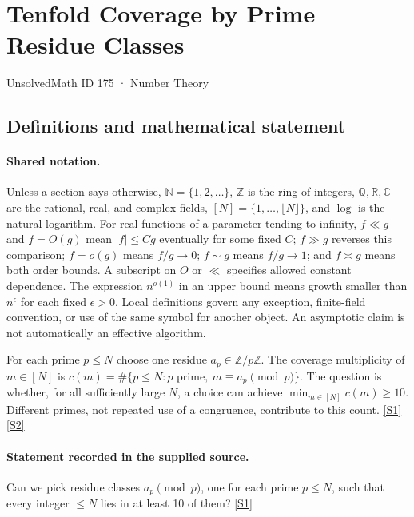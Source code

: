\documentclass[11pt,a4paper]{article}
\newcommand{\N}{\mathbb{N}}
\newcommand{\Z}{\mathbb{Z}}
\newcommand{\Q}{\mathbb{Q}}
\newcommand{\R}{\mathbb{R}}
\newcommand{\C}{\mathbb{C}}
\newcommand{\sref}[2]{\hyperlink{source:#1:#2}{[S#2]}}
\begin{document}

\setcounter{section}{174}

\section{Tenfold Coverage by Prime Residue Classes}\label{175}

{\small\sffamily UnsolvedMath ID 175 · Number Theory}

\subsection{Definitions and mathematical statement}

\paragraph{Shared notation.}Unless a section says otherwise, $\N=\{1,2,\ldots\}$,
$\Z$ is the ring of integers, $\Q,\R,\C$ are the rational, real, and complex
fields, $[N]=\{1,\ldots,\lfloor N\rfloor\}$, and $\log$ is the natural
logarithm. For real functions of a parameter tending to infinity,
$f\ll g$ and $f=O(g)$ mean $|f|\leq Cg$ eventually for some fixed $C$;
$f\gg g$ reverses this comparison; $f=o(g)$ means $f/g\to0$;
$f\sim g$ means $f/g\to1$; and $f\asymp g$ means both order bounds.
A subscript on $O$ or $\ll$ specifies allowed constant dependence.
The expression $n^{o(1)}$ in an upper bound means growth smaller than
$n^\epsilon$ for each fixed $\epsilon>0$. Local definitions govern any
exception, finite-field convention, or use of the same symbol for another
object. An asymptotic claim is not automatically an effective algorithm.



For each prime $p\leq N$ choose one residue $a_p\in\Z/p\Z$. The coverage multiplicity of $m\in[N]$ is $c(m)=\#\{p\leq N:p\text{ prime},\ m\equiv a_p\pmod p\}$. The question is whether, for all sufficiently large $N$, a choice can achieve $\min_{m\in[N]}c(m)\geq10$. Different primes, not repeated use of a congruence, contribute to this count. \sref{175}{1} \sref{175}{2}

\paragraph{Statement recorded in the supplied source.}
Can we pick residue classes $a_p \pmod p$, one for each prime $p \leq N$, such that every integer $\leq N$ lies in at least 10 of them? \sref{175}{1}
\end{document}
